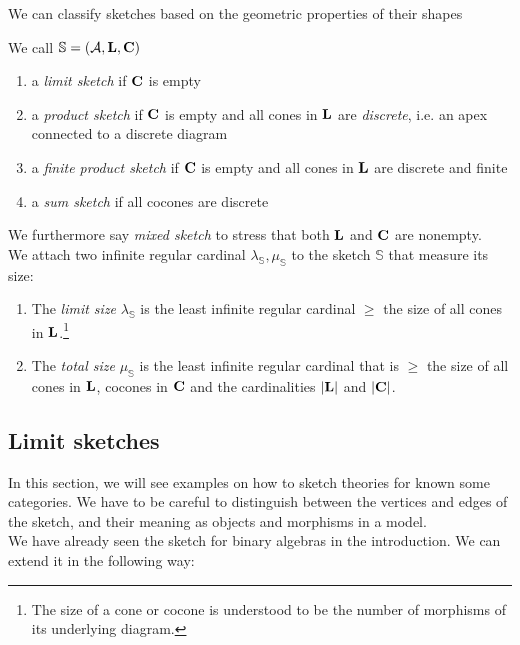 We can classify sketches based on the geometric properties of their shapes
\begin{Definition}
We call $\mathbb S = (\mathcal{A}, \textbf{L}, \textbf{C})$
\begin{enumerate}
\item a \emph{limit sketch} if $\textbf{C}$ is empty
\item a \emph{product sketch} if $\textbf{C}$ is empty and all cones in $\textbf{L}$ are \emph{discrete}, i.e. an apex connected to a discrete diagram
\item a \emph{finite product sketch} if $\textbf{C}$ is empty and all cones in $\textbf{L}$ are discrete and finite
\item a \emph{sum sketch} if all cocones are discrete
\end{enumerate}
We furthermore say \emph{mixed sketch} to stress that both $\textbf{L}$ and $\textbf{C}$ are nonempty. \\

We attach two infinite regular cardinal $\lambda_\mathbb S, \mu_\mathbb S$ to the sketch $\mathbb S$ that measure its size:
\begin{enumerate}
\item The \emph{limit size} $\lambda_\mathbb S$ is the least infinite regular cardinal $\geq$ the size of all cones in $\textbf{L}$.\footnote{The size of a cone or cocone is understood to be the number of morphisms of its underlying diagram.}

\item The \emph{total size} $\mu_\mathbb S$ is the least infinite regular cardinal that is $\geq$ the size of all cones in $\textbf{L}$, cocones in $\textbf{C}$ and the cardinalities $|\textbf{L}|$ and $|\textbf{C}|$.
\end{enumerate}
\end{Definition}


\subsection{Limit sketches}

In this section, we will see examples on how to sketch theories for known some categories. We have to be careful to distinguish between the vertices and edges of the sketch, and their meaning as objects and morphisms in a model. \\

We have already seen the sketch for binary algebras in the introduction. We can extend it in the following way:


